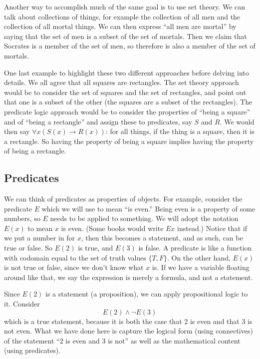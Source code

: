 \documentclass[10pt,]{book}
\theoremstyle{plain}
\theoremstyle{definition}
\theoremstyle{definition}
\theoremstyle{definition}
\numberwithin{equation}{chapter}
\def\imp{\rightarrow}
\begin{document}
      Another way to accomplish much of the same goal is to use set theory. We can talk about collections of things, for example the collection of all men and the collection of all mortal things. We can then express ``all men are mortal'' by saying that the set of men is a subset of the set of mortals. Then we claim that Socrates is a member of the set of men, so therefore is also a member of the set of mortals.
\par

      One last example to highlight these two different approaches before delving into details. We all agree that all squares are rectangles. The set theory approach would be to consider the set of squares and the set of rectangles, and point out that one is a subset of the other (the squares are a subset of the rectangles). The predicate logic approach would be to consider the properties of ``being a square'' and of ``being a rectangle'' and assign these to predicates, say \(S\) and \(R\). We would then say \(\forall x (S(x) \imp R(x))\): for all things, if the thing is a square, then it is a rectangle. So having the property of being a square implies having the property of being a rectangle.
\typeout{************************************************}
\typeout{************************************************}
\subsection[Predicates]{Predicates}\label{subsection-29}

      We can think of predicates as properties of objects. For example, consider the predicate \(E\) which we will use to mean ``is even.'' Being even is a property of some numbers, so \(E\) needs to be applied to something. We will adopt the notation \(E(x)\) to mean \(x\) is even. (Some books would write \(Ex\) instead.) Notice that if we put a number in for \(x\), then this becomes a statement, and as such, can be true or false. So \(E(2)\) is true, and \(E(3)\) is false. A predicate is like a function with codomain equal to the set of truth values \(\{T, F\}\). On the other hand, \(E(x)\) is not true or false, since we don't know what \(x\) is. If we have a variable floating around like that, we say the expression is merely a formula, and not a statement.
\par

      Since \(E(2)\) is a statement (a proposition), we can apply propositional logic to it. Consider
      \begin{equation*}
        E(2) \wedge \neg E(3)
      \end{equation*}
      which is a true statement, because it is both the case that 2 is even and that 3 is not even. What we have done here is capture the logical form (using connectives) of the statement ``2 is even and 3 is not'' as well as the mathematical content (using predicates).
\par
\end{document}
